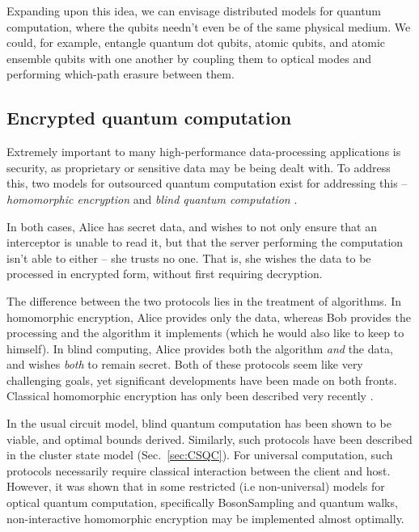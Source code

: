 \documentclass[aps,rmp,twocolumn,amsmath,amssymb,nofootinbib,superscriptaddress,longbibliography,floatfix]{revtex4-1}
\newcommand{\comment}[1]{{\color{blue}{\textbf{#1}}}}
\begin{document}
Expanding upon this idea, we can envisage distributed models for quantum computation, where the qubits needn't even be of the same physical medium. We could, for example, entangle quantum dot qubits, atomic qubits, and atomic ensemble qubits with one another by coupling them to optical modes and performing which-path erasure between them.

%
%

\subsection{Encrypted quantum computation} \label{sec:homo_blind}

Extremely important to many high-performance data-processing applications is security, as proprietary or sensitive data may be being dealt with. To address this, two models for outsourced quantum computation exist for addressing this -- \emph{homomorphic encryption} \cite{???, gentry2009fully, van2010fully} and \emph{blind quantum computation} \cite{???, bib:blind2, bib:blind3, bib:blind1, PhysRevLett.108.200502, bib:Morimae3486, bib:Morimae5460, bib:Morimae3966}.

In both cases, Alice has secret data, and wishes to not only ensure that an interceptor is unable to read it, but that the server performing the computation isn't able to either -- she trusts no one. That is, she wishes the data to be processed in encrypted form, without first requiring decryption.

The difference between the two protocols lies in the treatment of algorithms. In homomorphic encryption, Alice provides only the data, whereas Bob provides the processing and the algorithm it implements (which he would also like to keep to himself). In blind computing, Alice provides both the algorithm \emph{and} the data, and wishes \emph{both} to remain secret. Both of these protocols seem like very challenging goals, yet significant developments have been made on both fronts. Classical homomorphic encryption has only been described very recently \cite{bib:gentry2009fully, bib:van2010fully}. \comment{What about classical blind computation?}

In the usual circuit model, blind quantum computation has been shown to be viable, and optimal bounds derived. Similarly, such protocols have been described \cite{homoCS} in the cluster state model (Sec.~\ref{sec:CSQC}). For universal computation, such protocols necessarily require classical interaction between the client and host. However, it was shown that in some restricted (i.e non-universal) models for optical quantum computation, specifically {\sc BosonSampling} and quantum walks, non-interactive homomorphic encryption may be implemented almost optimally.
\end{document}
